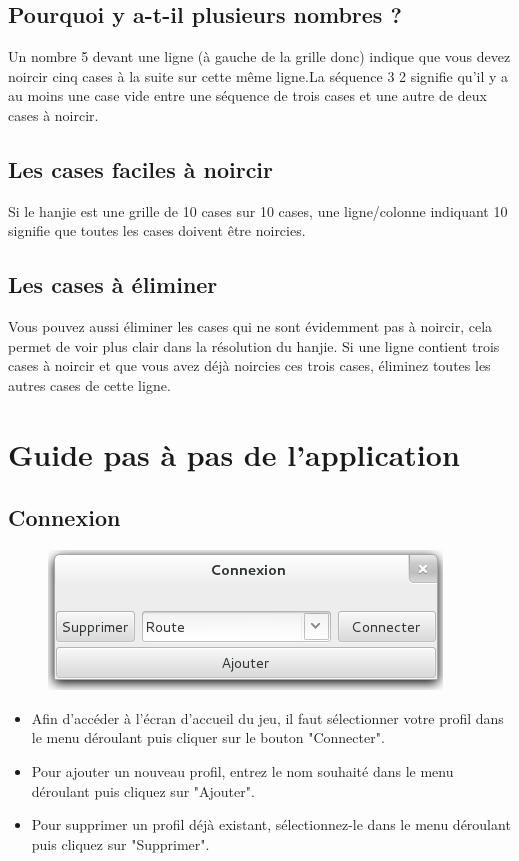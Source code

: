 \documentclass[a4paper, 12pt, twoside]{article}
\begin{document}
\subsection{Pourquoi y a-t-il plusieurs nombres ?}
Un nombre 5 devant une ligne (à gauche de la grille donc) indique que vous devez noircir cinq cases à la suite sur cette même ligne.La séquence 3 2 signifie qu'il y a au moins une case vide entre une séquence de trois cases et une autre de deux cases à noircir.

\subsection{Les cases faciles à noircir}
Si le hanjie est une grille de 10 cases sur 10 cases, une ligne/colonne indiquant 10 signifie que toutes les cases doivent être noircies.

\subsection{Les cases à éliminer}
Vous pouvez aussi éliminer les cases qui ne sont évidemment pas à noircir, cela permet de voir plus clair dans la résolution du hanjie. Si une ligne contient trois cases à noircir et que vous avez déjà noircies ces trois cases, éliminez toutes les autres cases de cette ligne.


\section{Guide pas à pas de l'application}

\subsection{Connexion}

\begin{figure}[H]
  \center
  \includegraphics[scale=0.8]{connexion.png}
  \label{connexion}
\end{figure}

\begin{itemize}\setlength{\itemsep}{1mm}
 \item Afin d'accéder à l'écran d'accueil du jeu, il faut sélectionner votre profil dans le menu déroulant puis cliquer sur le bouton "Connecter".
 \item Pour ajouter un nouveau profil, entrez le nom souhaité dans le menu déroulant puis cliquez sur "Ajouter".
 \item Pour supprimer un profil déjà existant, sélectionnez-le dans le menu déroulant puis cliquez sur "Supprimer".
\end{itemize}
\end{document}
